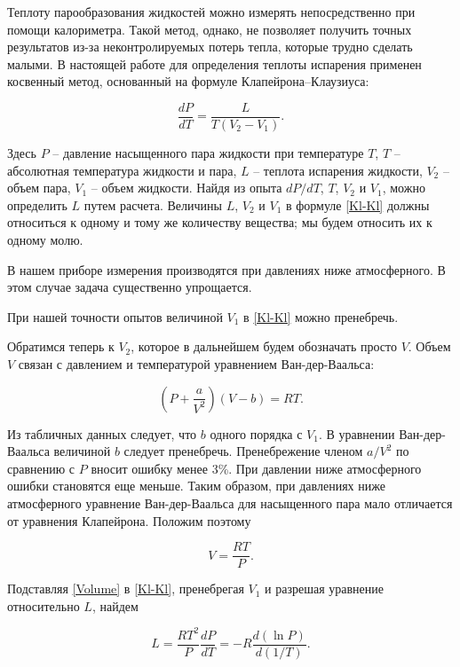 \documentclass[12pt,a4paper]{article}
\begin{document}
Теплоту парообразования жидкостей можно измерять непосредственно при помощи калориметра. Такой метод, однако, не позволяет получить точных результатов из-за неконтролируемых потерь тепла, которые трудно сделать малыми. В настоящей работе для определения теплоты испарения применен косвенный метод, основанный на формуле Клапейрона–Клаузиуса:

\begin{equation}\label{Kl-Kl}
\frac{dP}{dT}=\frac{L}{T\left(V_2-V_1\right)}.
\end{equation}

Здесь $ P $ -- давление насыщенного пара жидкости при температуре $ T $, $ T $ -- абсолютная температура жидкости и пара, $ L $ -- теплота испарения жидкости, $ V_2 $ -- объем пара, $ V_1 $ -- объем жидкости. Найдя из опыта $ dP/dT $, $ T $, $ V_2 $ и $ V_1 $, можно определить $ L $ путем расчета. Величины $ L $, $ V_2 $ и $ V_1 $ в формуле \eqref{Kl-Kl} должны относиться к одному и тому же количеству вещества; мы будем относить их к одному молю.

В нашем приборе измерения производятся при давлениях ниже атмосферного. В этом случае задача существенно упрощается.

При нашей точности опытов величиной $ V_1 $ в \eqref{Kl-Kl} можно пренебречь.

Обратимся теперь к $ V_2 $, которое в дальнейшем будем обозначать просто $ V $. Объем $ V $ связан с давлением и температурой уравнением Ван-дер-Ваальса:

\begin{equation}\label{VDV}
\left(P+\frac{a}{V^2}\right)\left(V-b\right)=RT.
\end{equation}

Из табличных данных следует, что $ b $ одного порядка с $ V_1 $. В уравнении Ван-дер-Ваальса величиной $ b $ следует пренебречь. Пренебрежение членом $ a/V^2 $ по сравнению с $ P $ вносит ошибку менее 3\%. При давлении ниже атмосферного ошибки становятся еще меньше. Таким образом, при давлениях ниже атмосферного уравнение Ван-дер-Ваальса для насыщенного пара мало отличается от уравнения Клапейрона. Положим поэтому

\begin{equation}\label{Volume}
V=\frac{RT}{P}.
\end{equation}

Подставляя \eqref{Volume} в \eqref{Kl-Kl}, пренебрегая $ V_1 $ и разрешая уравнение относительно $ L $, найдем

\begin{equation}\label{final}
L=\frac{RT^2}{P}\frac{dP}{dT}=-R\frac{d(\ln P)}{d(1/T)}.
\end{equation}
\end{document}
